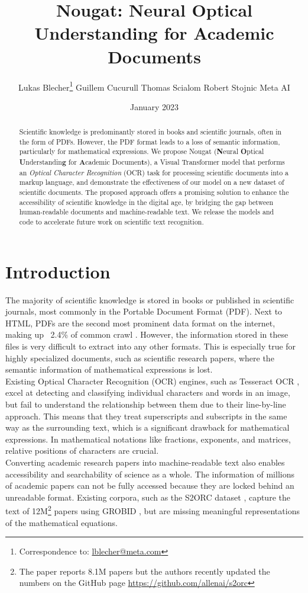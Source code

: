 \documentclass[]{article}
\title{Nougat: Neural Optical Understanding for Academic Documents}
\author{
  Lukas Blecher\thanks{Correspondence to: \href{mailto:lblecher@meta.com}{lblecher@meta.com}}
  \And
  Guillem Cucurull
  \And
  Thomas Scialom
  \And
  Robert Stojnic
  \AND
  Meta AI
}
\date{January 2023}
\begin{document}
\maketitle
\begin{abstract}
Scientific knowledge is predominantly stored in books and scientific journals, often in the form of PDFs. However, the PDF format leads to a loss of semantic information, particularly for mathematical expressions. 
We propose Nougat ({\bf N}eural {\bf O}ptical {\bf U}nderstandin{\bf g} for {\bf A}cademic Documen{\bf t}s), a Visual Transformer model that performs an \emph{Optical Character Recognition} (OCR) task for processing scientific documents into a markup language, and demonstrate the effectiveness of our model on a new dataset of scientific documents. The proposed approach offers a promising solution to enhance the accessibility of scientific knowledge in the digital age, by bridging the gap between human-readable documents and machine-readable text. We release the models and code to accelerate future work on scientific text recognition. 
\end{abstract}
\section{Introduction}

The majority of scientific knowledge is stored in books or published in scientific journals, most commonly in the Portable Document Format (PDF).
Next to HTML, PDFs are the second most prominent data format on the internet, making up ~2.4\% of common crawl \cite{sebastian_spiegler_statistics_2013}. However, the information stored in these files is very difficult to extract into any other formats. This is especially true for highly specialized documents, such as scientific research papers, where the semantic information of mathematical expressions is lost.\\
Existing Optical Character Recognition (OCR) engines, such as Tesseract OCR \cite{smith_overview_2007}, excel at detecting and classifying individual characters and words in an image,
but fail to understand the relationship between them due to their line-by-line approach. This means that they treat superscripts and subscripts in the same way as the surrounding text, which is a significant drawback for mathematical expressions. In mathematical notations like fractions, exponents, and matrices, relative positions of characters are crucial.\\
Converting academic research papers into machine-readable text also enables accessibility and searchability of science as a whole. The information of millions of academic papers can not be fully accessed because they are locked behind an unreadable format. Existing corpora, such as the S2ORC dataset \cite{lo_s2orc_2020}, capture the text of 12M\footnote{The paper reports 8.1M papers but the authors recently updated the numbers on the GitHub page \url{https://github.com/allenai/s2orc}} papers using GROBID \cite{lopez_grobid_2023}, but are missing meaningful representations of the mathematical equations.
\end{document}
